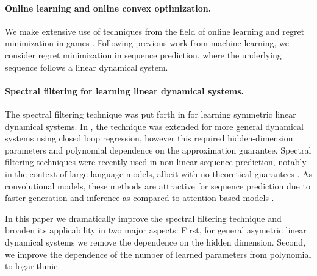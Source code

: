 \paragraph{Online learning and online convex optimization.}
We make extensive use of techniques from the field of online learning and regret minimization in games \citep{cesa2006prediction, hazan2016introduction}. Following previous work from machine learning, we consider regret minimization in sequence prediction, where the underlying sequence follows a linear dynamical system.   

\paragraph{Spectral filtering for learning linear dynamical systems.}
The spectral filtering technique was put forth in \cite{hazan2017learning} for learning symmetric linear dynamical systems. In \cite{hazan2018spectral}, the technique was extended for more general dynamical systems using closed loop regression, however this required hidden-dimension parameters and polynomial dependence on the approximation guarantee. Spectral filtering techniques were recently used in non-linear sequence prediction, notably in the context of large language models, albeit with no theoretical guarantees \cite{agarwal2023spectral}. As convolutional models, these methods are attractive for sequence prediction due to faster generation and inference as compared to attention-based models \cite{agarwal2024futurefill}.

In this paper we dramatically improve the spectral filtering technique and broaden its applicability in two major aspects: First, for general asymetric linear dynamical systems we remove the dependence on the hidden dimension. Second, we improve the dependence of the number of learned parameters from polynomial to logarithmic.   
    

%